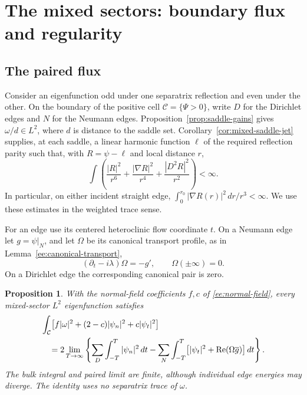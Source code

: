 \documentclass[reqno,11pt]{amsart}
\numberwithin{equation}{section}
\newtheorem{proposition}[theorem]{Proposition}
\theoremstyle{remark}
\begin{document}
\section{The mixed sectors: boundary flux and regularity}
\label{sec:mixed-regularity}

\subsection{The paired flux}
\label{sec:mixed-flux}

Consider an eigenfunction odd under one separatrix reflection and
even under the other. On the boundary of the positive cell
$\mathcal C=\{\Psi>0\}$, write $D$ for the Dirichlet edges and $N$
for the Neumann edges. Proposition~\ref{prop:saddle-gains} gives
$\omega/d\in L^2$, where $d$ is distance to the saddle set.
Corollary~\ref{cor:mixed-saddle-jet} supplies, at each saddle,
a linear harmonic function $\ell$ of the required reflection parity
such that, with $R=\psi-\ell$ and local distance $r$,
\begin{equation}\label{mf:weighted-remainder}
 \int\left(\frac{|R|^2}{r^6}
          +\frac{|\nabla R|^2}{r^4}
          +\frac{|D^2R|^2}{r^2}\right)<\infty.
\end{equation}
In particular, on either incident straight edge,
$\int_0^{r_0}|\nabla R(r)|^2\,dr/r^3<\infty$.
We use these estimates in the weighted trace sense.

For an edge use its centered heteroclinic flow coordinate $t$.
On a Neumann edge let $g=\psi|_N$, and let $\Omega$ be its canonical
transport profile, as in Lemma~\ref{ee:canonical-transport},
\[
 (\partial_t-i\lambda)\Omega=-g',\qquad
 \Omega(\pm\infty)=0.
\]
On a Dirichlet edge the corresponding canonical pair is zero.

\begin{proposition}\label{mf:paired-identity}
With the normal-field coefficients $f,c$ of
\eqref{ee:normal-field}, every
mixed-sector $L^2$ eigenfunction satisfies
\begin{align}\label{mf:paired}
 &\int_{\mathcal C}
       \bigl[f|\omega|^2+(2-c)|\psi_n|^2+c|\psi_t|^2\bigr]\notag\\
 &\quad=2\lim_{T\to\infty}\left\{
      \sum_{D}\int_{-T}^{T}|\psi_n|^2\,dt
       -\sum_{N}\int_{-T}^{T}
                  \bigl[|\psi_t|^2+
                    \operatorname{Re}(\Omega\overline g)\bigr]\,dt
                                      \right\}.
\end{align}
The bulk integral and paired limit are finite, although individual
edge energies may diverge. The identity uses no separatrix trace of
$\omega$.
\end{proposition}
\end{document}
